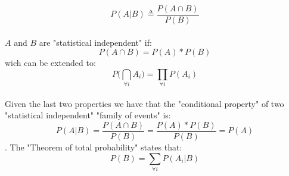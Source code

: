 \documentclass[10pt,a4paper]{book}
\begin{document}
		$$P(A|B) \triangleq \frac{P(A \cap B)}{P(B)}$$\\
		$A$ and $B$ are "statistical independent" if:\\
		$$P(A \cap B) = P(A)*P(B)$$
		wich can be extended to:\\
		$$ P\big(\bigcap_{\forall i}{ A_i}\big) = \prod_{\forall i}{P(A_i)} $$\\
		Given the last two properties we have that the "conditional property" of two "statistical independent" "family of events" is:\\
		$$ P(A|B) = \frac{P(A \cap B)}{P(B)} = \frac{P(A)*P(B)}{P(B)} = P(A) $$.
		The "Theorem of total probability" states that:\\
		$$P(B) = \sum_{\forall i}{P(A_i|B)}$$
\end{document}
